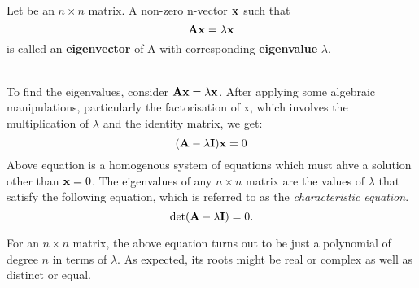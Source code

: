 

\begin{definition}
  Let  be an $n \times n$ matrix. A non-zero n-vector $\mathbf{x}$ such that
  $$\mathbf{A} \mathbf{x} = \lambda \mathbf{x}$$ is called an \textbf{eigenvector} of \matri A
  with corresponding \textbf{eigenvalue} $\lambda$.
\end{definition}~\\
To find the eigenvalues, consider $\mathbf{Ax} = \lambda \mathbf{x}$. After applying some
algebraic manipulations, particularly the factorisation of \matri x, which involves
the multiplication of $\lambda$ and the identity matrix, we get:
 \[ (\mathbf{A} - \lambda\mathbf{I})\mathbf{x} = 0\]
Above equation is a homogenous system of equations which must ahve a solution other
than $\mathbf{x} = 0$. 
The eigenvalues of any $n \times n$ matrix  are the values of $\lambda$ that
satisfy the following equation, which is referred to as the \emph{characteristic
equation}. 
\[\det(\mathbf{A} - \lambda\mathbf{I}) = 0.\]
\begin{note}
  For an $n \times n$ matrix, the above equation turns out to be just a polynomial of
  degree $n$ in terms of $\lambda$. As expected, its roots might be real or complex
  as well as distinct or equal.
\end{note}
